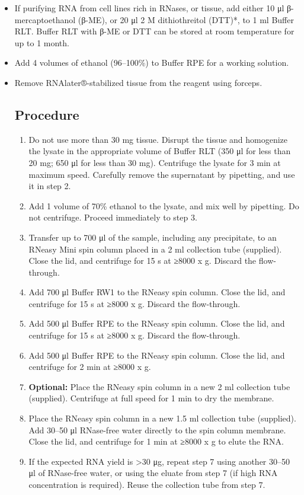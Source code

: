 \documentclass[
  letterpaper,
  DIV=11,
  numbers=noendperiod]{scrreprt}
\begin{document}
\begin{itemize}
\item
  If purifying RNA from cell lines rich in RNases, or tissue, add either
  10 μl β-mercaptoethanol (β-ME), or 20 μl 2 M dithiothreitol (DTT)*, to
  1 ml Buffer RLT. Buffer RLT with β-ME or DTT can be stored at room
  temperature for up to 1 month.
\item
  Add 4 volumes of ethanol (96--100\%) to Buffer RPE for a working
  solution.
\item
  Remove RNAlater®-stabilized tissue from the reagent using forceps.

  \hypertarget{procedure-1}{%
  \subsection*{Procedure}\label{procedure-1}}

  \begin{enumerate}
  \def\labelenumi{\arabic{enumi}.}
  \item
    Do not use more than 30 mg tissue. Disrupt the tissue and homogenize
    the lysate in the appropriate volume of Buffer RLT (350 μl for less
    than 20 mg; 650 μl for less than 30 mg). Centrifuge the lysate for 3
    min at maximum speed. Carefully remove the supernatant by pipetting,
    and use it in step 2.
  \item
    Add 1 volume of 70\% ethanol to the lysate, and mix well by
    pipetting. Do not centrifuge. Proceed immediately to step 3.
  \item
    Transfer up to 700 μl of the sample, including any precipitate, to
    an RNeasy Mini spin column placed in a 2 ml collection tube
    (supplied). Close the lid, and centrifuge for 15 s at ≥8000 x g.
    Discard the flow-through.
  \item
    Add 700 μl Buffer RW1 to the RNeasy spin column. Close the lid, and
    centrifuge for 15 s at ≥8000 x g. Discard the flow-through.
  \item
    Add 500 μl Buffer RPE to the RNeasy spin column. Close the lid, and
    centrifuge for 15 s at ≥8000 x g. Discard the flow-through.
  \item
    Add 500 μl Buffer RPE to the RNeasy spin column. Close the lid, and
    centrifuge for 2 min at ≥8000 x g.
  \item
    \textbf{Optional:} Place the RNeasy spin column in a new 2 ml
    collection tube (supplied). Centrifuge at full speed for 1 min to
    dry the membrane.
  \item
    Place the RNeasy spin column in a new 1.5 ml collection tube
    (supplied). Add 30--50 μl RNase-free water directly to the spin
    column membrane. Close the lid, and centrifuge for 1 min at ≥8000 x
    g to elute the RNA.
  \item
    If the expected RNA yield is \textgreater30 μg, repeat step 7 using
    another 30--50 μl of RNase-free water, or using the eluate from step
    7 (if high RNA concentration is required). Reuse the collection tube
    from step 7.
  \end{enumerate}
\end{itemize}
\end{document}
